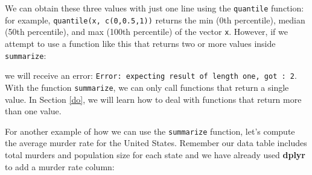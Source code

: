 \documentclass[
]{krantz}
\newenvironment{Shaded}{\begin{snugshade}}{\end{snugshade}}
\newcommand{\DataTypeTok}[1]{\textcolor[rgb]{0.27,0.27,0.27}{#1}}
\newcommand{\DecValTok}[1]{\textcolor[rgb]{0.06,0.06,0.06}{#1}}
\newcommand{\FloatTok}[1]{\textcolor[rgb]{0.06,0.06,0.06}{#1}}
\newcommand{\KeywordTok}[1]{\textcolor[rgb]{0.27,0.27,0.27}{\textbf{#1}}}
\newcommand{\NormalTok}[1]{#1}
\newcommand{\OperatorTok}[1]{\textcolor[rgb]{0.43,0.43,0.43}{\textbf{#1}}}
\newcommand{\StringTok}[1]{\textcolor[rgb]{0.5,0.5,0.5}{#1}}
\begin{document}
\begin{Shaded}
\end{Shaded}

We can obtain these three values with just one line using the \texttt{quantile} function: for example, \texttt{quantile(x,\ c(0,0.5,1))} returns the min (0th percentile), median (50th percentile), and max (100th percentile) of the vector \texttt{x}. However, if we attempt to use a function like this that returns two or more values inside \texttt{summarize}:

\begin{Shaded}
\end{Shaded}

we will receive an error: \texttt{Error:\ expecting\ result\ of\ length\ one,\ got\ :\ 2}. With the function \texttt{summarize}, we can only call functions that return a single value. In Section \ref{do}, we will learn how to deal with functions that return more than one value.

For another example of how we can use the \texttt{summarize} function, let's compute the average murder rate for the United States. Remember our data table includes total murders and population size for each state and we have already used \textbf{dplyr} to add a murder rate column:

\begin{Shaded}
\end{Shaded}
\end{document}

